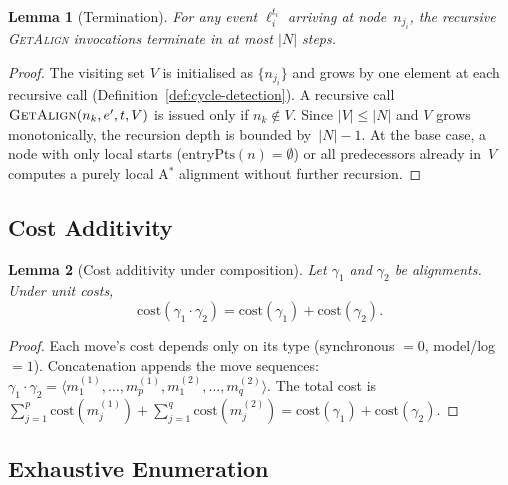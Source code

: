 \documentclass[11pt,a4paper]{article}
\newtheorem{lemma}{Lemma}
\newcommand{\Nodes}{N}
\newcommand{\cost}{\mathrm{cost}}
\newcommand{\alignment}{\gamma}
\newcommand{\ep}{\mathrm{entryPts}}
\newcommand{\GA}{\textsc{GetAlign}}
\begin{document}
\begin{lemma}[Termination]\label{lem:termination}
  For any event $\ell_i^{t_i}$ arriving at node~$n_{j_i}$, the
  recursive \GA{} invocations terminate in at most $|\Nodes|$ steps.
\end{lemma}

\begin{proof}
  The visiting set $V$ is initialised as $\{n_{j_i}\}$ and
  grows by one element at each recursive call
  (Definition~\ref{def:cycle-detection}).
  A recursive call $\GA(n_k, e', t, V)$ is issued only if
  $n_k \notin V$.
  Since $|V| \leq |\Nodes|$ and $V$ grows monotonically,
  the recursion depth is bounded by~$|\Nodes| - 1$.
  At the base case, a node with only local starts ($\ep(n) = \emptyset$)
  or all predecessors already in~$V$ computes a purely local A$^{*}$
  alignment without further recursion.
\end{proof}

\subsection{Cost Additivity}

\begin{lemma}[Cost additivity under composition]\label{lem:additivity}
  Let $\alignment_1$ and $\alignment_2$ be alignments.  Under unit costs,
  \[
    \cost(\alignment_1 \cdot \alignment_2)
    = \cost(\alignment_1) + \cost(\alignment_2).
  \]
\end{lemma}

\begin{proof}
  Each move's cost depends only on its type (synchronous $= 0$,
  model/log $= 1$).  Concatenation appends the move sequences:
  $\alignment_1 \cdot \alignment_2 =
    \langle m_1^{(1)}, \ldots, m_p^{(1)},
            m_1^{(2)}, \ldots, m_q^{(2)} \rangle$.
  The total cost is
  $\sum_{j=1}^{p} \cost(m_j^{(1)}) + \sum_{j=1}^{q} \cost(m_j^{(2)})
  = \cost(\alignment_1) + \cost(\alignment_2)$.
\end{proof}

\subsection{Exhaustive Enumeration}
\end{document}
